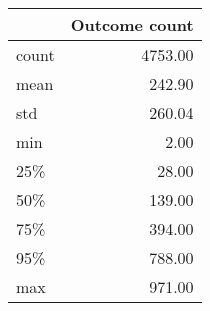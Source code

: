 \begin{tabular}{lr}
\toprule
{} &  Outcome count \\
\midrule
count &        4753.00 \\
mean  &         242.90 \\
std   &         260.04 \\
min   &           2.00 \\
25\%   &          28.00 \\
50\%   &         139.00 \\
75\%   &         394.00 \\
95\%   &         788.00 \\
max   &         971.00 \\
\bottomrule
\end{tabular}
